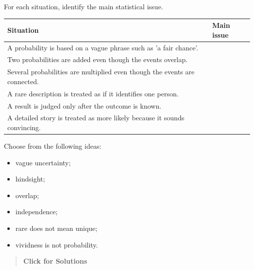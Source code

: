 \documentclass[
  letterpaper,
  DIV=11,
  numbers=noendperiod]{scrreprt}
\providecommand{\tightlist}{%
  \setlength{\itemsep}{0pt}\setlength{\parskip}{0pt}}
\begin{document}
\begin{tcolorbox}[enhanced jigsaw, arc=.35mm, bottomrule=.15mm, bottomtitle=1mm, breakable, colback=white, colbacktitle=quarto-callout-note-color!10!white, colframe=quarto-callout-note-color-frame, coltitle=black, left=2mm, leftrule=.75mm, opacityback=0, opacitybacktitle=0.6, rightrule=.15mm, title=\textcolor{quarto-callout-note-color}{\faInfo}\hspace{0.5em}{Question 16}, titlerule=0mm, toprule=.15mm, toptitle=1mm]

For each situation, identify the main statistical issue.

\begin{table}
\fontsize{12.0pt}{14.0pt}\selectfont
\begin{tabular*}{\linewidth}{@{\extracolsep{\fill}}ll}
\toprule
Situation & Main issue \\ 
\midrule\addlinespace[2.5pt]
A probability is based on a vague phrase such as 'a fair chance'. &  \\ 
Two probabilities are added even though the events overlap. &  \\ 
Several probabilities are multiplied even though the events are connected. &  \\ 
A rare description is treated as if it identifies one person. &  \\ 
A result is judged only after the outcome is known. &  \\ 
A detailed story is treated as more likely because it sounds convincing. &  \\ 
\bottomrule
\end{tabular*}
\end{table}

Choose from the following ideas:

\begin{itemize}
\tightlist
\item
  vague uncertainty;
\item
  hindsight;
\item
  overlap;
\item
  independence;
\item
  rare does not mean unique;
\item
  vividness is not probability.
\end{itemize}

\begin{quote}
\textbf{Click for Solutions}


\end{quote}
\end{tcolorbox}
\end{document}
